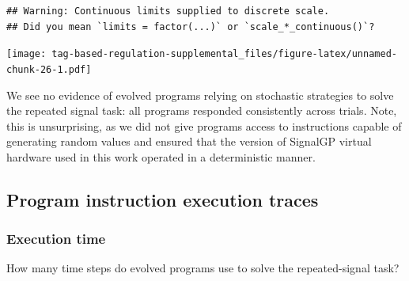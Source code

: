 \documentclass[
]{book}
\begin{document}
\begin{verbatim}
## Warning: Continuous limits supplied to discrete scale.
## Did you mean `limits = factor(...)` or `scale_*_continuous()`?
\end{verbatim}

\texttt{[image: tag-based-regulation-supplemental\_files/figure-latex/unnamed-chunk-26-1.pdf]}

We see no evidence of evolved programs relying on stochastic strategies to solve the repeated signal task: all programs responded consistently across trials.
Note, this is unsurprising, as we did not give programs access to instructions capable of generating random values and ensured that the version of SignalGP virtual hardware used in this work operated in a deterministic manner.

\hypertarget{program-instruction-execution-traces}{%
\subsection{Program instruction execution traces}\label{program-instruction-execution-traces}}

\hypertarget{execution-time}{%
\subsubsection{Execution time}\label{execution-time}}

How many time steps do evolved programs use to solve the repeated-signal task?
\end{document}
